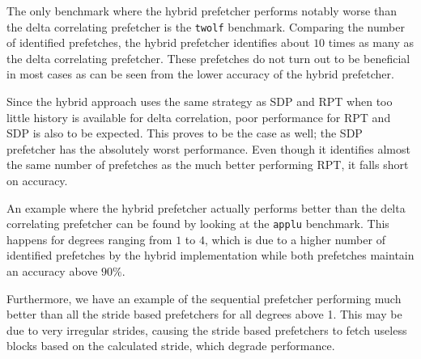 The only benchmark where the hybrid prefetcher performs notably worse than the
delta correlating prefetcher is the \texttt{twolf} benchmark.
Comparing the number of identified prefetches, the hybrid prefetcher identifies
about $10$ times as many as the delta correlating prefetcher.
These prefetches do not turn out to be beneficial in most cases as can be seen
from the lower accuracy of the hybrid prefetcher.

Since the hybrid approach uses the same strategy as SDP and RPT when too little
history is available for delta correlation, poor performance for RPT and SDP is
also to be expected.
This proves to be the case as well; the SDP prefetcher has the absolutely worst
performance.
Even though it identifies almost the same number of prefetches as the much
better performing RPT, it falls short on accuracy.

An example where the hybrid prefetcher actually performs better than the delta
correlating prefetcher can be found by looking at the \texttt{applu} benchmark.
This happens for degrees ranging from $1$ to $4$, which is due to a higher
number of identified prefetches by the hybrid implementation while both
prefetches maintain an accuracy above $90\%$.

Furthermore, we have an example of the sequential prefetcher performing much
better than all the stride based prefetchers for all degrees above 1.
This may be due to very irregular strides, causing the stride based prefetchers
to fetch useless blocks based on the calculated stride, which degrade
performance.
